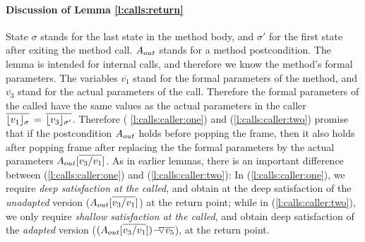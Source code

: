 \paragraph{Discussion of Lemma \ref{l:calls:return}}  
 State  $\sigma$ stands for the last state in the method body, and $\sigma'$ for the first state after exiting  the method call.
$\Aout$ stands for a method postcondition.
The lemma is intended for internal calls, and therefore we know the method's formal parameters.
The variables   $\overline {v_1}$ stand for the formal  parameters of the method, and  $\overline {v_3}$ stand for the actual parameters of the call.
Therefore the   formal parameters of the called have the same values as the actual parameters in the caller
  $  \overline {\interpret {\sigma} {v_1} }\, =\,  \overline {\interpret {\sigma'}  {v_3} }$.
Therefore   ( \ref{l:calls:caller:one})  and  (\ref{l:calls:caller:two})  
promise that if the postcondition $\Aout$ holds before popping the frame, then it also holds after popping frame after replacing the 
the formal parameters by the actual parameters $\Aout[\overline{v_3/v_1}]$.
As in earlier lemmas, there is an important difference between  (\ref{l:calls:caller:one}) and (\ref{l:calls:caller:two}):
In (\ref{l:calls:caller:one}), we require \emph{deep satisfaction at the called}, 
and obtain at the deep satisfaction of the \emph{unadapted} version ($\Aout[\overline{v_3/v_1}]$) at the return point;
while in (\ref{l:calls:caller:two}), we only require \emph{shallow satisfaction at the called}, 
and obtain deep satisfaction of the \emph{adapted} version (${\PushASLong  {\overline {v_5}}    {(\Aout[\overline { v_3/v_1}])} }$),
at the return point.

